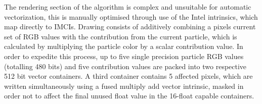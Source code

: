 \documentclass[runningheads,a4paper]{llncs}
\begin{document}
The rendering section of the algorithm is complex and unsuitable for automatic vectorization, this is manually 
optimised through use of the Intel intrinsics, which map directly to IMCIs. Drawing consists of additively 
combining a pixels current set of RGB values with the contribution from the current particle, which is calculated by 
multiplying the particle color by a scalar contribution value. In order to expedite this process, up to five single 
precision particle RGB values (totalling 480 bits) and five contribution values are packed into two respective 
512 bit vector containers. A third container contains 5 affected pixels, which are written simultaneously using a 
fused multiply add vector intrinsic, masked in order not to affect the final unused float value in the 16-float 
capable containers.



\end{document}

